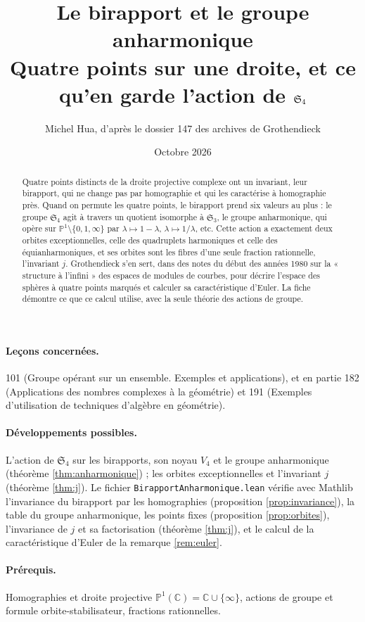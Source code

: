 \documentclass[11pt,a4paper]{article}
\title{Le birapport et le groupe anharmonique\\[2pt]
\large Quatre points sur une droite, et ce qu'en garde l'action de \texorpdfstring{$\Sym_4$}{S4}}
\author{Michel Hua, d'après le dossier 147 des archives de Grothendieck}
\date{Octobre 2026}
\theoremstyle{plain}
\theoremstyle{definition}
\theoremstyle{remark}
\newcommand{\C}{\mathbb{C}}
\newcommand{\Pu}{\mathbb{P}^1}
\newcommand{\Sym}{\mathfrak{S}}
\begin{document}
\maketitle

\begin{abstract}
Quatre points distincts de la droite projective complexe ont un invariant, leur birapport, qui ne change pas par homographie et qui les caractérise à homographie près. Quand on permute les quatre points, le birapport prend six valeurs au plus : le groupe $\Sym_4$ agit à travers un quotient isomorphe à $\Sym_3$, le groupe anharmonique, qui opère sur $\Pu\setminus\{0,1,\infty\}$ par $\lambda\mapsto1-\lambda$, $\lambda\mapsto1/\lambda$, etc. Cette action a exactement deux orbites exceptionnelles, celle des quadruplets harmoniques et celle des équianharmoniques, et ses orbites sont les fibres d'une seule fraction rationnelle, l'invariant $j$. Grothendieck s'en sert, dans des notes du début des années 1980 sur la « structure à l'infini » des espaces de modules de courbes, pour décrire l'espace des sphères à quatre points marqués et calculer sa caractéristique d'Euler. La fiche démontre ce que ce calcul utilise, avec la seule théorie des actions de groupe.
\end{abstract}

\paragraph{Leçons concernées.} 101 (Groupe opérant sur un ensemble. Exemples et applications), et en partie 182 (Applications des nombres complexes à la géométrie) et 191 (Exemples d'utilisation de techniques d'algèbre en géométrie).

\paragraph{Développements possibles.} L'action de $\Sym_4$ sur les birapports, son noyau $V_4$ et le groupe anharmonique (théorème \ref{thm:anharmonique}) ; les orbites exceptionnelles et l'invariant $j$ (théorème \ref{thm:j}). Le fichier \texttt{BirapportAnharmonique.lean} vérifie avec Mathlib l'invariance du birapport par les homographies (proposition \ref{prop:invariance}), la table du groupe anharmonique, les points fixes (proposition \ref{prop:orbites}), l'invariance de $j$ et sa factorisation (théorème \ref{thm:j}), et le calcul de la caractéristique d'Euler de la remarque \ref{rem:euler}.

\paragraph{Prérequis.} Homographies et droite projective $\Pu(\C)=\C\cup\{\infty\}$, actions de groupe et formule orbite-stabilisateur, fractions rationnelles.
\end{document}
